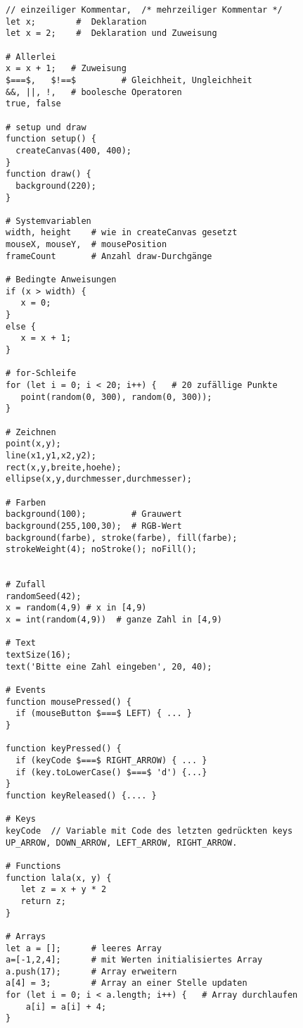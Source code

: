 \documentclass[a4paper,11pt,landscape,twocolumn]{book}
\begin{document}
\parskip 4pt
\thispagestyle{ErsteSeite}
\footnotesize
\lstset{tabsize=4, basicstyle=\footnotesize, showstringspaces=false,mathescape=true}

\begin{lstlisting} 
// einzeiliger Kommentar,  /* mehrzeiliger Kommentar */ 
let x;        #  Deklaration
let x = 2;    #  Deklaration und Zuweisung

# Allerlei
x = x + 1;   # Zuweisung
$===$,   $!==$         # Gleichheit, Ungleichheit
&&, ||, !,   # boolesche Operatoren
true, false

# setup und draw
function setup() {             
  createCanvas(400, 400);
}
function draw() {
  background(220);
} 

# Systemvariablen
width, height    # wie in createCanvas gesetzt
mouseX, mouseY,  # mousePosition
frameCount       # Anzahl draw-Durchgänge

# Bedingte Anweisungen
if (x > width) {
   x = 0;
}
else {
   x = x + 1;
}
  
# for-Schleife
for (let i = 0; i < 20; i++) {   # 20 zufällige Punkte
   point(random(0, 300), random(0, 300));
}

# Zeichnen
point(x,y);
line(x1,y1,x2,y2);
rect(x,y,breite,hoehe);
ellipse(x,y,durchmesser,durchmesser);

# Farben
background(100);         # Grauwert
background(255,100,30);  # RGB-Wert
background(farbe), stroke(farbe), fill(farbe);  
strokeWeight(4); noStroke(); noFill();


# Zufall
randomSeed(42);
x = random(4,9) # x in [4,9)
x = int(random(4,9))  # ganze Zahl in [4,9)

# Text 
textSize(16);
text('Bitte eine Zahl eingeben', 20, 40);

# Events
function mousePressed() {
  if (mouseButton $===$ LEFT) { ... }
}

function keyPressed() {
  if (keyCode $===$ RIGHT_ARROW) { ... }
  if (key.toLowerCase() $===$ 'd') {...}
}
function keyReleased() {.... }  

# Keys
keyCode  // Variable mit Code des letzten gedrückten keys
UP_ARROW, DOWN_ARROW, LEFT_ARROW, RIGHT_ARROW.

# Functions
function lala(x, y) {
   let z = x + y * 2
   return z;
}

# Arrays
let a = [];      # leeres Array
a=[-1,2,4];      # mit Werten initialisiertes Array
a.push(17);      # Array erweitern
a[4] = 3;        # Array an einer Stelle updaten
for (let i = 0; i < a.length; i++) {   # Array durchlaufen
	a[i] = a[i] + 4;
}

\end{lstlisting} 
\end{document}
